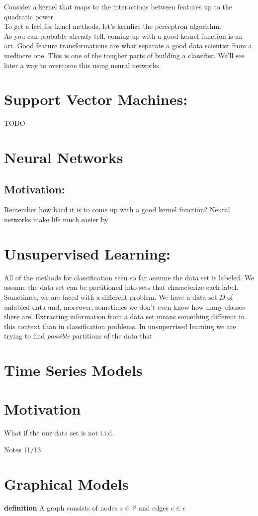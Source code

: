 \documentclass[10pt]{article}
\begin{document}
	Consider a kernel that maps to the interactions between features up to the quadratic power. \\
	
	To get a feel for kenel methods, let's kernlize the perceptron algorithm. \\
	
	As you can probably already tell, coming up with a good kernel function is an art. Good feature transformations 
	are what separate a good data scientist from a mediocre one. This is one of the tougher parts of building 
	a classifier. We'll see later a way to overcome this using neural networks. 
	
	
\section*{Support Vector Machines:}
	TODO

\section*{Neural Networks}
	\subsection*{Motivation:}
		Remember how hard it is to come up with a good kernel function? Neural networks make life much easier
		by
\section*{Unsupervised Learning:}
	All of the methods for classification seen so far assume the data set is labeled. We assume the data set can be 
	partitioned into sets that characterize each label. Sometimes, we are faced with a different problem.
	We have a data set $D$ of unlabled data and, moreover, sometimes we don't even know how many classes there 
	are. Extracting information from a data set means something different in this context than in classification problems. 
	In unsupervised learning we are trying to find \textit{possible} partitions of the data that  




\section*{Time Series Models}
	\section*{Motivation}
		What if the our data set is not i.i.d.
		
		
		
Notes 11/13	

\section*{Graphical Models}
	\textbf{definition} A graph consists of nodes $s \in \mathcal V$ and edges $e \in \epsilon$ 
		
		
		
		
		
		
		
		
		
		
		
		
		
		
		
		
		
		



		
\end{document}
